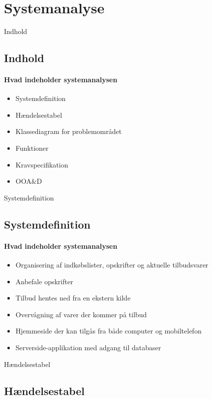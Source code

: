 \section{Systemanalyse}
\begin{frame}{Indhold}
	\subsection{Indhold}
	\framesubtitle{Hvad indeholder systemanalysen}
	\begin{itemize} 
		\item Systemdefinition
		\item Hændelsestabel
		\item Klassediagram for problemområdet
		\item Funktioner
		\item Kravspecifikation
		\item OOA\&D
		\end{itemize}
\end{frame}

\begin{frame}{Systemdefinition}
	\subsection{Systemdefinition}
	\framesubtitle{Hvad indeholder systemanalysen}
	\begin{itemize} 
		\item Organisering af indkøbslister, opskrifter og aktuelle tilbudsvarer
		\item Anbefale opskrifter
		\item Tilbud hentes ned fra en ekstern kilde
		\item Overvågning af varer der kommer på tilbud
		\item Hjemmeside der kan tilgås fra både computer og mobiltelefon
		\item Serverside-applikation med adgang til databaser
	\end{itemize}
\end{frame}

\begin{frame}{Hændelsestabel}
\subsection{Hændelsestabel}
	\framesubtitle{}
	
\end{frame}

